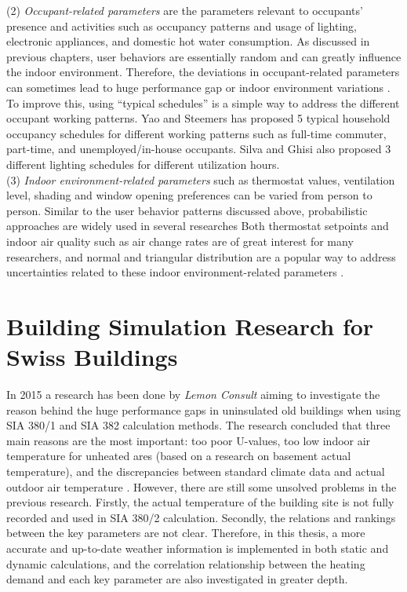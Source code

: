 \documentclass[a4paper, oneside]{discothesis}
\begin{document}
		(2) \textit{Occupant-related parameters} are the parameters relevant to occupants' presence and activities such as occupancy patterns and usage of lighting, electronic appliances, and domestic hot water consumption. As discussed in previous chapters, user behaviors are essentially random and can greatly influence the indoor environment. Therefore, the deviations in occupant-related parameters can sometimes lead to huge performance gap or indoor environment variations \cite{GeorgeThesis}. To improve this, using ``typical schedules'' is a simple way to address the different occupant working patterns. Yao and Steemers \cite{yao2005method} has proposed 5 typical household occupancy schedules for different working patterns such as full-time commuter, part-time, and unemployed/in-house occupants. Silva and Ghisi \cite{silva2014uncertainty} also proposed 3 different lighting schedules for different utilization hours.\\

		(3) \textit{Indoor environment-related parameters} such as thermostat values, ventilation level, shading and window opening preferences can be varied from person to person. Similar to the user behavior patterns discussed above, probabilistic approaches are widely used in several researches \cite{GeorgeThesis} Both thermostat setpoints and indoor air quality such as air change rates are of great interest for many researchers, and normal and triangular distribution are a popular way to address uncertainties related to these indoor environment-related parameters \cite{GeorgeThesis}. 

	\section{Building Simulation Research for Swiss Buildings}
		In 2015 a research has been done by \textit{Lemon Consult} \cite{SIAPreviousreport} aiming to investigate the reason behind the huge performance gaps in uninsulated old buildings when using SIA 380/1 and SIA 382 calculation methods. The research concluded that three main reasons are the most important: too poor U-values, too low indoor air temperature for unheated ares (based on a research on basement actual temperature), and the discrepancies between standard climate data and actual outdoor air temperature \cite{SIAPreviousreport}. However, there are still some unsolved problems in the previous research. Firstly, the actual temperature of the building site is not fully recorded and used in SIA 380/2 calculation. Secondly, the relations and rankings between the key parameters are not clear. Therefore, in this thesis, a more accurate and up-to-date weather information is implemented in both static and dynamic calculations, and the correlation relationship between the heating demand and each key parameter are also investigated in greater depth.
\end{document}
